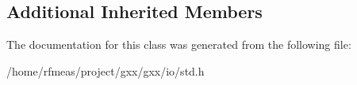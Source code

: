 \subsection*{Additional Inherited Members}


The documentation for this class was generated from the following file\+:\begin{DoxyCompactItemize}
\item 
/home/rfmeas/project/gxx/gxx/io/std.\+h\end{DoxyCompactItemize}

